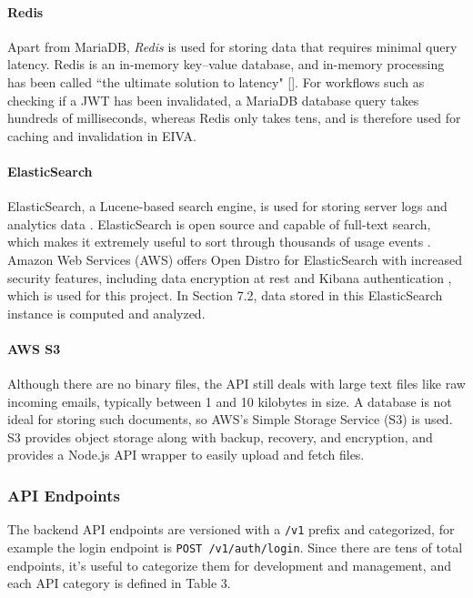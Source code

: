 \documentclass{article}
\begin{document}
\paragraph{Redis}

Apart from MariaDB, \emph{Redis} is used for storing data that requires minimal query latency. Redis is an in-memory key–value database, and in-memory processing has been called ``the ultimate solution to latency" []. For workflows such as checking if a JWT has been invalidated, a MariaDB database query takes hundreds of milliseconds, whereas Redis only takes tens, and is therefore used for caching and invalidation in EIVA.

\paragraph{ElasticSearch}

ElasticSearch, a Lucene-based search engine, is used for storing server logs and analytics data \cite{noauthor_elastic_nodate}. ElasticSearch is open source and capable of full-text search, which makes it extremely useful to sort through thousands of usage events \cite{noauthor_elastic/elasticsearch_2020}. Amazon Web Services (AWS) offers Open Distro for ElasticSearch with increased security features, including data encryption at rest and Kibana authentication \cite{noauthor_open_nodate}, which is used for this project. In Section 7.2, data stored in this ElasticSearch instance is computed and analyzed.

\paragraph{AWS S3}

Although there are no binary files, the API still deals with large text files like raw incoming emails, typically between 1 and 10 kilobytes in size. A database is not ideal for storing such documents, so AWS's Simple Storage Service (S3) is used. S3 provides object storage along with backup, recovery, and encryption, and provides a Node.js API wrapper to easily upload and fetch files.

\subsubsection{API Endpoints}

The backend API endpoints are versioned with a \texttt{/v1} prefix and categorized, for example the login endpoint is \texttt{POST /v1/auth/login}.  Since there are tens of total endpoints, it's useful to categorize them for development and management, and each API category is defined in Table 3.
\end{document}
